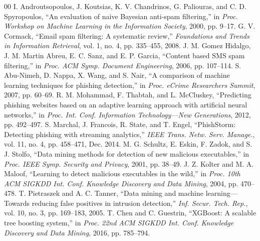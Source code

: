 \documentclass[conference]{IEEEtran}
\begin{document}
\begin{thebibliography}{00}
 I. Androutsopoulos, J. Koutsias, K. V. Chandrinos, G. Paliouras, and C. D. Spyropoulos, ``An evaluation of naive Bayesian anti-spam filtering,'' in \textit{Proc. Workshop on Machine Learning in the Information Society}, 2000, pp. 9--17.
 G. V. Cormack, ``Email spam filtering: A systematic review,'' \textit{Foundations and Trends in Information Retrieval}, vol. 1, no. 4, pp. 335--455, 2008.
 J. M. Gomez Hidalgo, J. M. Martin Abreu, E. C. Sanz, and E. P. Garcia, ``Content based SMS spam filtering,'' in \textit{Proc. ACM Symp. Document Engineering}, 2006, pp. 107--114.
 S. Abu-Nimeh, D. Nappa, X. Wang, and S. Nair, ``A comparison of machine learning techniques for phishing detection,'' in \textit{Proc. eCrime Researchers Summit}, 2007, pp. 60--69.
 R. M. Mohammad, F. Thabtah, and L. McCluskey, ``Predicting phishing websites based on an adaptive learning approach with artificial neural networks,'' in \textit{Proc. Int. Conf. Information Technology---New Generations}, 2012, pp. 492--497.
 S. Marchal, J. Francois, R. State, and T. Engel, ``PhishStorm: Detecting phishing with streaming analytics,'' \textit{IEEE Trans. Netw. Serv. Manage.}, vol. 11, no. 4, pp. 458--471, Dec. 2014.
 M. G. Schultz, E. Eskin, F. Zadok, and S. J. Stolfo, ``Data mining methods for detection of new malicious executables,'' in \textit{Proc. IEEE Symp. Security and Privacy}, 2001, pp. 38--49.
 J. Z. Kolter and M. A. Maloof, ``Learning to detect malicious executables in the wild,'' in \textit{Proc. 10th ACM SIGKDD Int. Conf. Knowledge Discovery and Data Mining}, 2004, pp. 470--478.
 T. Pietraszek and A. C. Tanner, ``Data mining and machine learning---Towards reducing false positives in intrusion detection,'' \textit{Inf. Secur. Tech. Rep.}, vol. 10, no. 3, pp. 169--183, 2005.
 T. Chen and C. Guestrin, ``XGBoost: A scalable tree boosting system,'' in \textit{Proc. 22nd ACM SIGKDD Int. Conf. Knowledge Discovery and Data Mining}, 2016, pp. 785--794.
\end{thebibliography}
\end{document}
